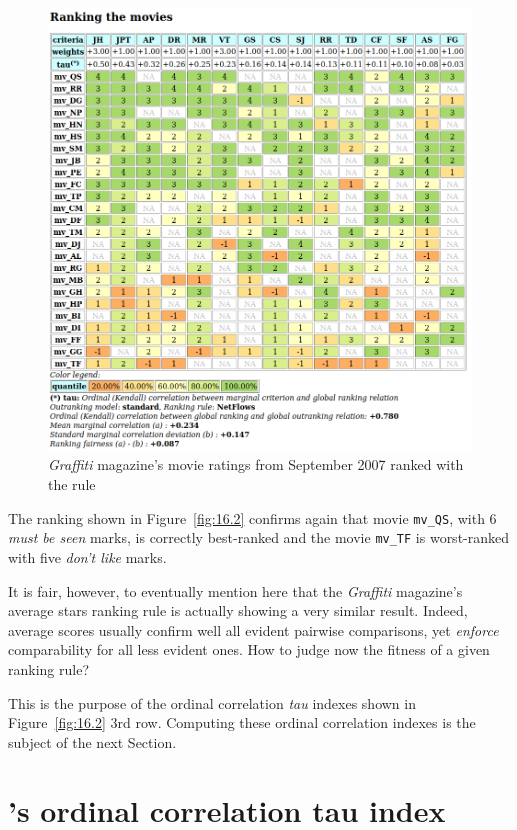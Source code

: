 \begin{figure}[ht]
\includegraphics[width=\hsize]{Figures/16-2-graffiti07_2.png}
\caption{\emph{Graffiti} magazine's movie ratings from September 2007 ranked with the \NetFlows rule}
\label{fig:16.2}       %
\end{figure}

The \NetFlows ranking shown in Figure~\vref{fig:16.2} confirms again that movie \texttt{mv\_QS}, with $6$ \emph{must be seen} marks, is correctly best-ranked and the movie \texttt{mv\_TF} is worst-ranked with five \emph{don't like} marks. 

It is fair, however, to eventually mention here that the \emph{Graffiti} magazine's average stars ranking rule is actually showing a very similar result. Indeed, average scores usually confirm well all evident pairwise comparisons, yet \emph{enforce} comparability for all less evident ones. How to judge now the fitness of a given ranking rule?

This is the purpose of the ordinal correlation \emph{tau} indexes shown in Figure~\vref{fig:16.2} 3rd row. Computing these ordinal correlation indexes is the subject of the next Section.
 
\section{\Kendall 's ordinal correlation tau index}
\label{sec:16:2}

